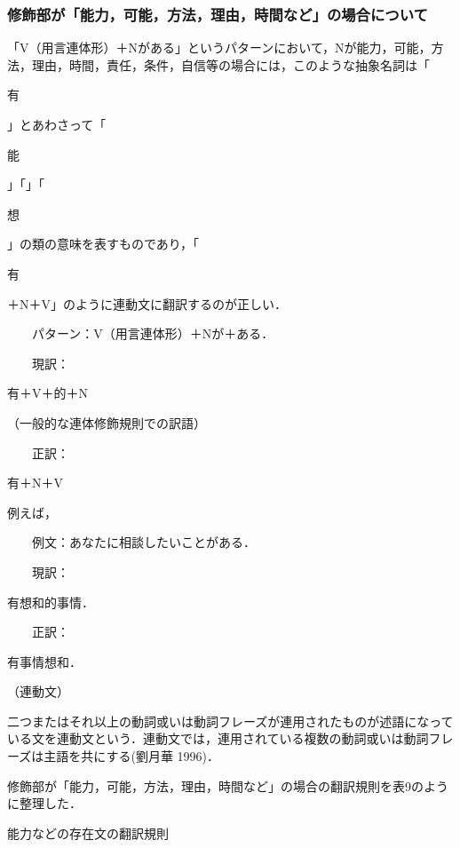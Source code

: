 \documentclass[japanese]{jnlp_1.4}
\begin{document}
\subsubsection{修飾部が「能力，可能，方法，理由，時間など」の場合について}

「V（用言連体形）＋Nがある」というパターンにおいて，Nが能力，可能，方法，理由，時間，責任，条件，自信等の場合には，このような抽象名詞は「\begin{簡体中文}有\end{簡体中文}」とあわさって「\begin{簡体中文}能\end{簡体中文}」「」「\begin{簡体中文}想\end{簡体中文}」の類の意味を表すものであり，「\begin{簡体中文}有\end{簡体中文}＋N＋V」のように連動文に翻訳するのが正しい．

　　パターン：V（用言連体形）＋Nが＋ある．

　　現訳：\begin{簡体中文}有＋V＋的＋N\end{簡体中文}\hfill （一般的な連体修飾規則での訳語）

　　正訳：\begin{簡体中文}有＋N＋V\end{簡体中文}

例えば，

　　例文：あなたに相談したいことがある．

　　現訳：\begin{簡体中文}有想和的事情．\end{簡体中文}

　　正訳：\begin{簡体中文}有事情想和．\end{簡体中文}\hfill （連動文）

二つまたはそれ以上の動詞或いは動詞フレーズが連用されたものが述語になっている文を連動文という．連動文では，連用されている複数の動詞或いは動詞フレーズは主語を共にする(劉月華 1996)．

修飾部が「能力，可能，方法，理由，時間など」の場合の翻訳規則を表9のように整理した．

\begin{table}[b]
\caption{能力などの存在文の翻訳規則}

\end{table}
\end{document}
